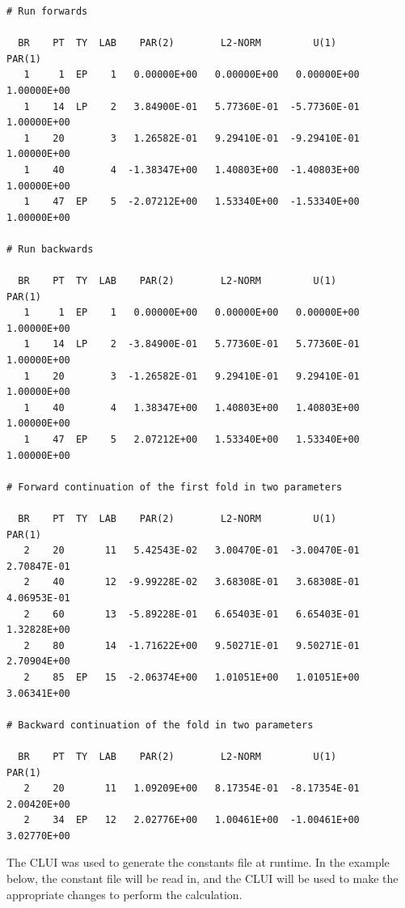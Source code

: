 \documentclass[12pt]{report}
\begin{document}
\begin{center}
\vspace{-0.2in}
\begin{verbatim}
# Run forwards
 
  BR    PT  TY  LAB    PAR(2)        L2-NORM         U(1)        PAR(1)     
   1     1  EP    1   0.00000E+00   0.00000E+00   0.00000E+00   1.00000E+00
   1    14  LP    2   3.84900E-01   5.77360E-01  -5.77360E-01   1.00000E+00
   1    20        3   1.26582E-01   9.29410E-01  -9.29410E-01   1.00000E+00
   1    40        4  -1.38347E+00   1.40803E+00  -1.40803E+00   1.00000E+00
   1    47  EP    5  -2.07212E+00   1.53340E+00  -1.53340E+00   1.00000E+00

# Run backwards
 
  BR    PT  TY  LAB    PAR(2)        L2-NORM         U(1)        PAR(1)     
   1     1  EP    1   0.00000E+00   0.00000E+00   0.00000E+00   1.00000E+00
   1    14  LP    2  -3.84900E-01   5.77360E-01   5.77360E-01   1.00000E+00
   1    20        3  -1.26582E-01   9.29410E-01   9.29410E-01   1.00000E+00
   1    40        4   1.38347E+00   1.40803E+00   1.40803E+00   1.00000E+00
   1    47  EP    5   2.07212E+00   1.53340E+00   1.53340E+00   1.00000E+00

# Forward continuation of the first fold in two parameters
 
  BR    PT  TY  LAB    PAR(2)        L2-NORM         U(1)        PAR(1)     
   2    20       11   5.42543E-02   3.00470E-01  -3.00470E-01   2.70847E-01
   2    40       12  -9.99228E-02   3.68308E-01   3.68308E-01   4.06953E-01
   2    60       13  -5.89228E-01   6.65403E-01   6.65403E-01   1.32828E+00
   2    80       14  -1.71622E+00   9.50271E-01   9.50271E-01   2.70904E+00
   2    85  EP   15  -2.06374E+00   1.01051E+00   1.01051E+00   3.06341E+00

# Backward continuation of the fold in two parameters

  BR    PT  TY  LAB    PAR(2)        L2-NORM         U(1)        PAR(1)     
   2    20       11   1.09209E+00   8.17354E-01  -8.17354E-01   2.00420E+00
   2    34  EP   12   2.02776E+00   1.00461E+00  -1.00461E+00   3.02770E+00
\end{verbatim}
\end{center}

The CLUI was used to generate the constants
file at runtime.  In the example below, the constant file 
will be read in, and the CLUI will be used to make the appropriate
changes to perform the calculation.
\end{document}
